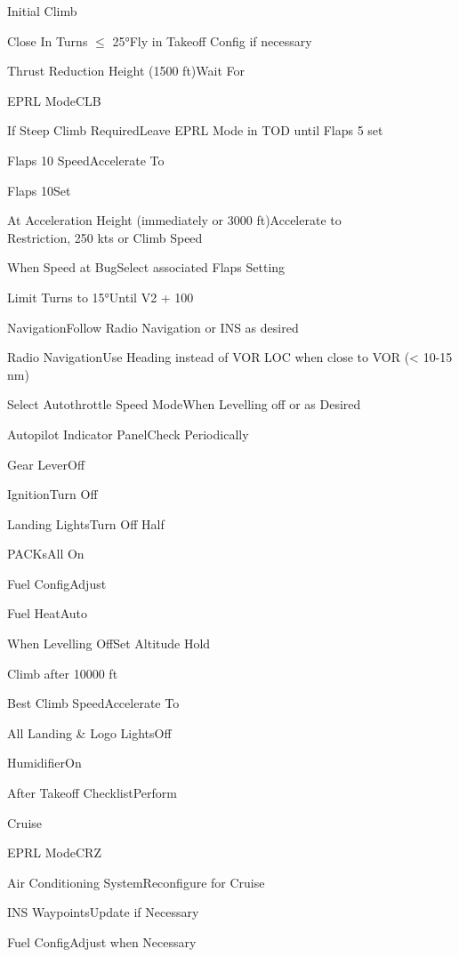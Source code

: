 \documentclass[sim-use]{checklist}
\begin{document}
\begin{checklist}{Initial Climb}
	\item{Close In Turns $\leq$ 25°}{Fly in Takeoff Config if necessary}
	\item{Thrust Reduction Height (1500 ft)}{Wait For}
	\item{EPRL Mode}{CLB}
	\item{If Steep Climb Required}{Leave EPRL Mode in TOD until Flaps 5 set}
	 {
		\item{Flaps 10 Speed}{Accelerate To}
		\item{Flaps 10}{Set}
	}
	\item{At Acceleration Height (immediately or 3000 ft)}{Accelerate to\\Restriction, 250 kts or Climb Speed}
	\item{When Speed at Bug}{Select associated Flaps Setting}
	\item{Limit Turns to 15°}{Until V2 + 100}
	\item{Navigation}{Follow Radio Navigation or INS as desired}
	\item{Radio Navigation}{Use Heading instead of VOR LOC when close to VOR (< 10-15 nm)}
	\item{Select Autothrottle Speed Mode}{When Levelling off or as Desired}
	\item{Autopilot Indicator Panel}{Check Periodically}
	 {
		\item{Gear Lever}{Off}
		\item{Ignition}{Turn Off}
		\item{Landing Lights}{Turn Off Half}
		\item{PACKs}{All On}
		\item{Fuel Config}{Adjust}
		\item{Fuel Heat}{Auto}
	}
	\item{When Levelling Off}{Set Altitude Hold}
\end{checklist}

\begin{checklist}{Climb after 10000 ft}
	\item{Best Climb Speed}{Accelerate To}
	\item{All Landing \& Logo Lights}{Off}
	\item{Humidifier}{On}
	\item{After Takeoff Checklist}{Perform}
\end{checklist}

\begin{checklist}{Cruise}
	 {
		\item{EPRL Mode}{CRZ}
		\item{Air Conditioning System}{Reconfigure for Cruise}
	}
	\item{INS Waypoints}{Update if Necessary}
	\item{Fuel Config}{Adjust when Necessary}
\end{checklist}
\end{document}
